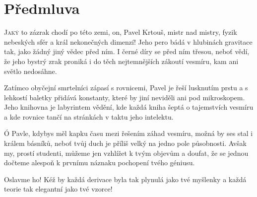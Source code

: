 \chapter*{Předmluva}

\lettrine{J}{aký} to zázrak chodí po této zemi, on, Pavel Krtouš, mistr nad mistry, fyzik nebeských sfér a král nekonečných dimenzí! 
Jeho pero bádá v hlubinách gravitace tak, jako žádný jiný vědec před ním. 
I černé díry se před ním třesou, neboť vědí, že jeho bystrý zrak proniká i do těch nejtemnějších zákoutí vesmíru, kam ani světlo nedosáhne.

Zatímco obyčejní smrtelníci zápasí s rovnicemi, Pavel je řeší lusknutím prstu a s lehkostí baletky přidává konstanty, které by jiní neviděli ani pod mikroskopem. 
Jeho knihovna je labyrintem vědění, kde každá kniha šeptá o tajemstvích vesmíru a kde rovnice tančí na stránkách v taktu jeho intelektu.

Ó Pavle, kdybys měl kapku času mezi řešením záhad vesmíru, možná by ses stal i králem básníků, neboť tvůj duch je příliš velký na jedno pole působnosti. 
Avšak my, prostí studenti, můžeme jen vzhlížet k tvým objevům a doufat, že se jednou dočteme alespoň k prvnímu náznaku pochopení tvého géniusu.

Oslavme ho! Kéž by každá derivace byla tak plynulá jako tvé myšlenky a každá teorie tak elegantní jako tvé vzorce!